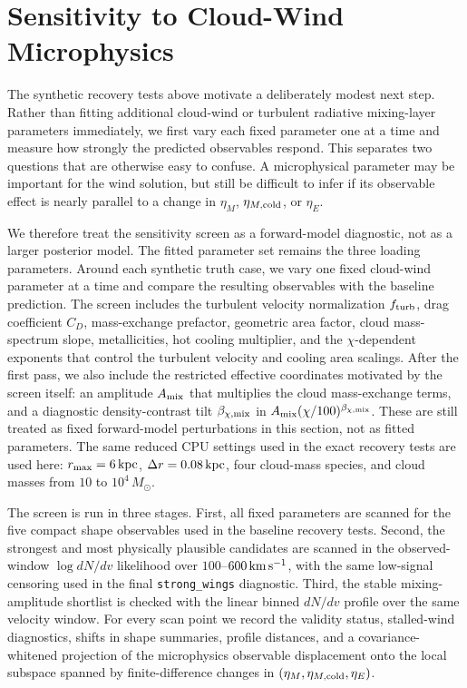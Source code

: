 \section{Sensitivity to Cloud-Wind Microphysics}
\label{sec:microphysics_sensitivity}

The synthetic recovery tests above motivate a deliberately modest next step.
Rather than fitting additional cloud-wind or turbulent radiative mixing-layer
parameters immediately, we first vary each fixed parameter one at a time and
measure how strongly the predicted observables respond.  This separates two
questions that are otherwise easy to confuse.  A microphysical parameter may be
important for the wind solution, but still be difficult to infer if its
observable effect is nearly parallel to a change in $\eta_M$,
$\eta_{M,\rm cold}$, or $\eta_E$.

We therefore treat the sensitivity screen as a forward-model diagnostic, not as
a larger posterior model.  The fitted parameter set remains the three loading
parameters.  Around each synthetic truth case, we vary one fixed cloud-wind
parameter at a time and compare the resulting observables with the baseline
prediction.  The screen includes the turbulent velocity normalization
$f_{\rm turb}$, drag coefficient $C_D$, mass-exchange prefactor, geometric area
factor, cloud mass-spectrum slope, metallicities, hot cooling multiplier, and
the $\chi$-dependent exponents that control the turbulent velocity and cooling
area scalings.  After the first pass, we also include the restricted effective
coordinates motivated by the screen itself: an amplitude $A_{\rm mix}$ that
multiplies the cloud mass-exchange terms, and a diagnostic density-contrast
tilt $\beta_{\chi,\rm mix}$ in
$A_{\rm mix}(\chi/100)^{\beta_{\chi,\rm mix}}$.  These are still treated as
fixed forward-model perturbations in this section, not as fitted parameters.
The same reduced CPU settings used in the exact recovery tests are used here:
$r_{\rm max}=6\,{\rm kpc}$, $\Delta r=0.08\,{\rm kpc}$, four cloud-mass
species, and cloud masses from $10$ to $10^4\,M_\odot$.

The screen is run in three stages.  First, all fixed parameters are scanned for
the five compact shape observables used in the baseline recovery tests.  Second,
the strongest and most physically plausible candidates are scanned in the
observed-window $\log dN/dv$ likelihood over $100$--$600\,{\rm km\,s^{-1}}$,
with the same low-signal censoring used in the final \texttt{strong\_wings}
diagnostic.  Third, the stable mixing-amplitude shortlist is checked with the
linear binned $dN/dv$ profile over the same velocity window.  For every scan
point we record the validity status, stalled-wind diagnostics, shifts in
shape summaries, profile distances, and a covariance-whitened projection of
the microphysics observable displacement onto the local subspace spanned by
finite-difference changes in $(\eta_M,\eta_{M,\rm cold},\eta_E)$.


